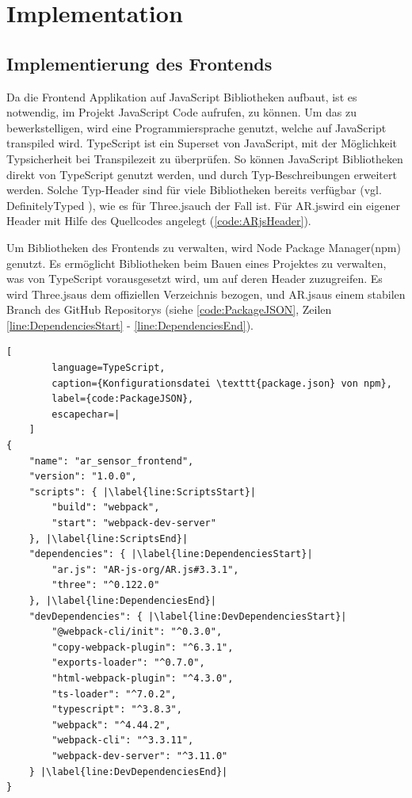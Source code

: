 \section{Implementation}


\subsection{Implementierung des Frontends}

Da die Frontend Applikation auf JavaScript Bibliotheken aufbaut,
ist es notwendig, im Projekt JavaScript Code aufrufen, zu können.
Um das zu bewerkstelligen, wird eine Programmiersprache genutzt,
welche auf JavaScript transpiled wird. TypeScript ist ein
Superset von JavaScript, mit der Möglichkeit Typsicherheit bei
Transpilezeit zu überprüfen. So können JavaScript Bibliotheken
direkt von TypeScript genutzt werden, und durch Typ-Beschreibungen
erweitert werden. Solche Typ-Header sind für viele Bibliotheken
bereits verfügbar (vgl. DefinitelyTyped \cite{DefinitelyTyped}),
wie es für \grqq Three.js\grqq\space auch der Fall ist. Für
\grqq AR.js\grqq\space wird ein eigener Header mit Hilfe des
Quellcodes angelegt (\lstlistingname\space \ref{code:ARjsHeader}).

\bigskip



Um Bibliotheken des Frontends zu verwalten, wird \grqq Node
Package Manager\grqq\space (npm) genutzt. Es ermöglicht
Bibliotheken beim Bauen eines Projektes zu verwalten, was von
TypeScript vorausgesetzt wird, um auf deren Header zuzugreifen.
Es wird \grqq Three.js\grqq\space aus dem offiziellen Verzeichnis
bezogen, und \grqq AR.js\grqq\space aus einem stabilen Branch des
GitHub Repositorys (siehe \lstlistingname\space \ref{code:PackageJSON}, Zeilen
\ref{line:DependenciesStart} - \ref{line:DependenciesEnd}).

\begin{codefloat}
	\begin{lstlisting}[
		language=TypeScript,
		caption={Konfigurationsdatei \texttt{package.json} von npm},
		label={code:PackageJSON},
		escapechar=|
	]
{
	"name": "ar_sensor_frontend",
	"version": "1.0.0",
	"scripts": { |\label{line:ScriptsStart}|
		"build": "webpack",
		"start": "webpack-dev-server"
	}, |\label{line:ScriptsEnd}|
	"dependencies": { |\label{line:DependenciesStart}|
		"ar.js": "AR-js-org/AR.js#3.3.1",
		"three": "^0.122.0"
	}, |\label{line:DependenciesEnd}|
	"devDependencies": { |\label{line:DevDependenciesStart}|
		"@webpack-cli/init": "^0.3.0",
		"copy-webpack-plugin": "^6.3.1",
		"exports-loader": "^0.7.0",
		"html-webpack-plugin": "^4.3.0",
		"ts-loader": "^7.0.2",
		"typescript": "^3.8.3",
		"webpack": "^4.44.2",
		"webpack-cli": "^3.3.11",
		"webpack-dev-server": "^3.11.0"
	} |\label{line:DevDependenciesEnd}|
}
	\end{lstlisting}
\end{codefloat}

